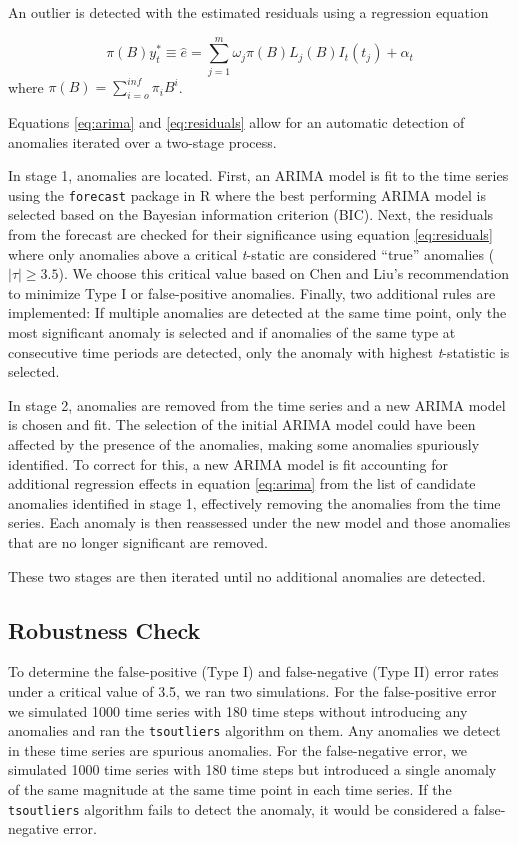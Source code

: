\documentclass[12pt]{article}
\begin{document}
An outlier is detected with the estimated residuals using a regression
equation

\begin{equation}
\label{eq:residuals}
\pi(B)y_t^* \equiv \hat{e} = \sum_{j=1}^m \omega_j \pi(B)L_j(B)I_t(t_j) + \alpha_t
\end{equation} where \(\pi(B)=\sum_{i=o}^{inf} \pi_iB^i\).

Equations \ref{eq:arima} and \ref{eq:residuals} allow for an automatic
detection of anomalies iterated over a two-stage process.

In stage 1, anomalies are located. First, an ARIMA model is fit to the
time series using the \texttt{forecast} package in R
\citep{Rforecast, hymdman2008} where the best performing ARIMA model is
selected based on the Bayesian information criterion (BIC). Next, the
residuals from the forecast are checked for their significance using
equation \ref{eq:residuals} where only anomalies above a critical
\emph{t}-static are considered ``true'' anomalies (\(|\tau| \geq 3.5\)).
We choose this critical value based on Chen and Liu's
\citeyearpar{chen1993joint} recommendation to minimize Type I or
false-positive anomalies. Finally, two additional rules are implemented:
If multiple anomalies are detected at the same time point, only the most
significant anomaly is selected and if anomalies of the same type at
consecutive time periods are detected, only the anomaly with highest
\emph{t}-statistic is selected.

In stage 2, anomalies are removed from the time series and a new ARIMA
model is chosen and fit. The selection of the initial ARIMA model could
have been affected by the presence of the anomalies, making some
anomalies spuriously identified. To correct for this, a new ARIMA model
is fit accounting for additional regression effects in equation
\ref{eq:arima} from the list of candidate anomalies identified in stage
1, effectively removing the anomalies from the time series. Each anomaly
is then reassessed under the new model and those anomalies that are no
longer significant are removed.

These two stages are then iterated until no additional anomalies are
detected.

\hypertarget{robustness-check}{%
\subsection{Robustness Check}\label{robustness-check}}

To determine the false-positive (Type I) and false-negative (Type II)
error rates under a critical value of 3.5, we ran two simulations. For
the false-positive error we simulated 1000 time series with 180 time
steps without introducing any anomalies and ran the \texttt{tsoutliers}
algorithm on them. Any anomalies we detect in these time series are
spurious anomalies. For the false-negative error, we simulated 1000 time
series with 180 time steps but introduced a single anomaly of the same
magnitude at the same time point in each time series. If the
\texttt{tsoutliers} algorithm fails to detect the anomaly, it would be
considered a false-negative error.
\end{document}

